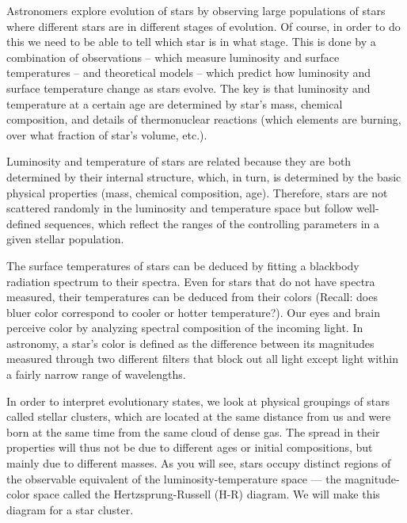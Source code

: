 Astronomers explore evolution of stars by observing large populations of stars where different stars are in different stages of evolution. Of course, in order to do this we need to be able to tell which star is in what stage. This is done by a combination of observations – which measure luminosity and surface temperatures – and theoretical models – which predict how luminosity and surface temperature change as stars evolve. The key is that luminosity and temperature at a certain age are determined by star's mass, chemical composition, and details of thermonuclear reactions (which elements are burning, over what fraction of star's volume, etc.).

Luminosity and temperature of stars are related because they are both determined by their internal structure, which, in turn, is determined by the basic physical properties (mass, chemical composition, age). Therefore, stars are not scattered randomly in the luminosity and temperature space but follow well-defined sequences, which reflect the ranges of the controlling parameters in a given stellar population. 

The surface temperatures of stars can be deduced by fitting a blackbody radiation spectrum to their spectra. Even for stars that do not have spectra measured, their temperatures can be deduced from their colors (Recall: does bluer color correspond to cooler or hotter temperature?). Our eyes and brain perceive color by analyzing spectral composition of the incoming light. In astronomy, a star's color is defined as the difference between its magnitudes measured through two different filters that block out all light except light within a fairly narrow range of wavelengths. 

In order to interpret evolutionary states, we look at physical groupings of stars called stellar clusters, which are located at the same distance from us and were born at the same time from the same cloud of dense gas. The spread in their properties will thus not be due to different ages or initial compositions, but mainly due to different masses. As you will see, stars occupy distinct regions of the observable equivalent of the luminosity-temperature space --- the magnitude-color space called the Hertzsprung-Russell (H-R) diagram. We will make this diagram for a star cluster.

